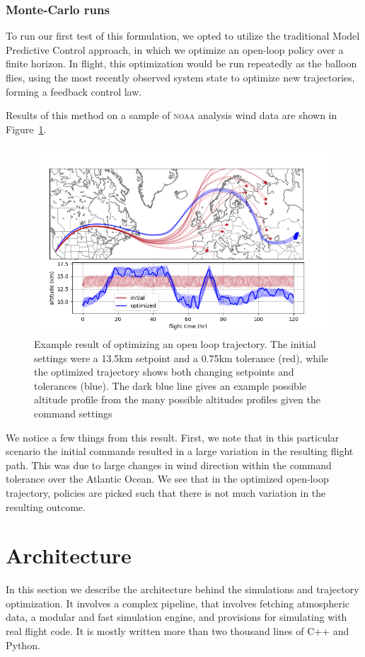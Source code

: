 \documentclass[11pt]{scrartcl} %
\begin{document}
\subsubsection*{Monte-Carlo runs}

To run our first test of this formulation, we opted to utilize the traditional Model Predictive Control approach, in which we optimize an open-loop policy over a finite horizon. In flight, this optimization would be run repeatedly as the balloon flies, using the most recently observed system state to optimize new trajectories, forming a feedback control law. 

Results of this method on a sample of \textsc{noaa} analysis wind data are shown in Figure~\ref{openloop}.
\begin{figure}[h]
\includegraphics[width=\linewidth]{datasheetfig.png}
\caption{Example result of optimizing an open loop trajectory. The initial settings were a 13.5km setpoint and a 0.75km tolerance (red), while the optimized trajectory shows both changing setpoints and tolerances (blue). The dark blue line gives an example possible altitude profile from the many possible altitudes profiles given the command settings}
\label{openloop}
\end{figure}
We notice a few things from this result. First, we note that in this particular scenario the initial commands resulted in a large variation in the resulting flight path. This was due to large changes in wind direction within the command tolerance over the Atlantic Ocean. We see that in the optimized open-loop trajectory, policies are picked such that there is not much variation in the resulting outcome. 



\newpage
\section{Architecture}
\label{arch}
In this section we describe the architecture behind the simulations and trajectory optimization. It involves a complex pipeline, that involves fetching atmospheric data, a modular and fast simulation engine, and provisions for simulating with real flight code. It is mostly written more than two thousand lines of C++ and Python.
\end{document}
